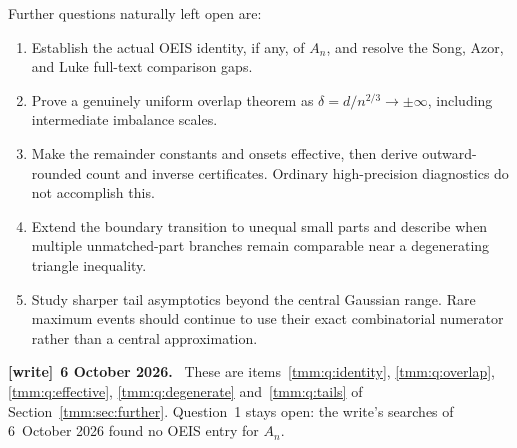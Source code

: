 \documentclass[11pt,letterpaper]{article}
\newcommand{\parthead}{Contents}
\theoremstyle{remark}\newtheorem{remark}[theorem]{Remark}
\newenvironment{writenote}[1][]{\par\smallskip\begingroup\small
 \noindent\textbf{[write]}\if\relax\detokenize{#1}\relax\else~\textbf{#1.}\fi\ }%
 {\par\endgroup\smallskip}
\begin{document}
Further questions naturally left open are:
\begin{enumerate}
\item Establish the actual OEIS identity, if any, of $A_n$, and resolve the Song, Azor, and Luke full-text comparison gaps.
\item Prove a genuinely uniform overlap theorem as $\delta=d/n^{2/3}\to\pm\infty$, including intermediate imbalance scales.
\item Make the remainder constants and onsets effective, then derive outward-rounded count and inverse certificates. Ordinary high-precision diagnostics do not accomplish this.
\item Extend the boundary transition to unequal small parts and describe when multiple unmatched-part branches remain comparable near a degenerating triangle inequality.
\item Study sharper tail asymptotics beyond the central Gaussian range. Rare maximum events should continue to use their exact combinatorial numerator rather than a central approximation.
\end{enumerate}
\begin{writenote}[6 October 2026]
These are items~\ref{tmm:q:identity}, \ref{tmm:q:overlap}, \ref{tmm:q:effective}, \ref{tmm:q:degenerate} and~\ref{tmm:q:tails} of Section~\ref{tmm:sec:further}. Question~1 stays open: the write's searches of 6~October 2026 found no OEIS entry for $A_n$.
\end{writenote}

\clearpage
\renewcommand{\parthead}{Further questions}
\end{document}
